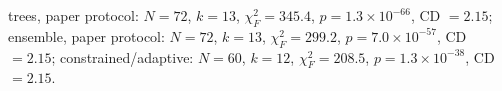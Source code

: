 trees, paper protocol: $N=72$, $k=13$, $\chi^2_F=345.4$, $p=1.3\times10^{-66}$, CD $=2.15$; ensemble, paper protocol: $N=72$, $k=13$, $\chi^2_F=299.2$, $p=7.0\times10^{-57}$, CD $=2.15$; constrained/adaptive: $N=60$, $k=12$, $\chi^2_F=208.5$, $p=1.3\times10^{-38}$, CD $=2.15$.